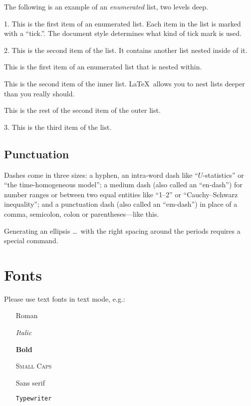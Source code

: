 \documentclass[aoas]{imsart}
\numberwithin{equation}{section}
\theoremstyle{plain}
\theoremstyle{remark}
\begin{document}
The following is an example of an \emph{enumerated} list, two levels
deep.

\begin{longlist}
\item[1.]
This is the first item of an enumerated list.  Each item
in the list is marked with a ``tick.''.  The document
style determines what kind of tick mark is used.
\item[2.]
This is the second item of the list.  It contains another
list nested inside of it.
\begin{longlist}
\item
This is the first item of an enumerated list that
is nested within.  
\item
This is the second item of the inner list.  \LaTeX\
allows you to nest lists deeper than you really should.
\end{longlist}
This is the rest of the second item of the outer list.
\item[3.]
This is the third item of the list.
\end{longlist}

\hypertarget{punctuation}{%
\subsection{Punctuation}\label{punctuation}}

Dashes come in three sizes: a hyphen, an intra-word dash like
``\(U\)-statistics'' or ``the time-homogeneous model''; a medium dash
(also called an ``en-dash'') for number ranges or between two equal
entities like ``1--2'' or ``Cauchy--Schwarz inequality''; and a
punctuation dash (also called an ``em-dash'') in place of a comma,
semicolon, colon or parentheses---like this.

Generating an ellipsis \ldots~with the right spacing around the periods
requires a special command.

\hypertarget{fonts}{%
\section{Fonts}\label{fonts}}

Please use text fonts in text mode, e.g.:

\begin{itemize}
\item[]\textrm{Roman}
\item[]\textit{Italic}
\item[]\textbf{Bold}
\item[]\textsc{Small Caps}
\item[]\textsf{Sans serif}
\item[]\texttt{Typewriter}
\end{itemize}
\end{document}
